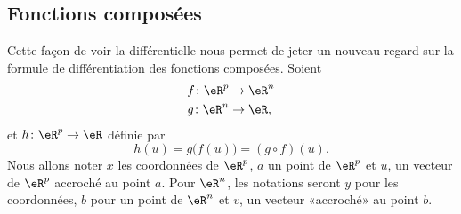 \subsection{Fonctions composées}

Cette façon de voir la différentielle nous permet de jeter un nouveau regard sur la formule de différentiation des fonctions composées. Soient
\begin{equation}
	\begin{aligned}[]
		f\colon \eR^p & \to \eR^n \\
		g\colon \eR^n & \to \eR,
	\end{aligned}
\end{equation}
et \( h\colon \eR^p\to \eR\) définie par
\begin{equation}
	h(u)=g\big( f(u) \big)=(g\circ f)(u).
\end{equation}
Nous allons noter \( x\) les coordonnées de \( \eR^p\), \( a\) un point de \( \eR^p\) et \( u\), un vecteur de \( \eR^p\) accroché au point \( a\). Pour \( \eR^n\), les notations seront \( y\) pour les coordonnées, \( b\) pour un point de \( \eR^n\) et \( v\), un vecteur «accroché» au point \( b\).

